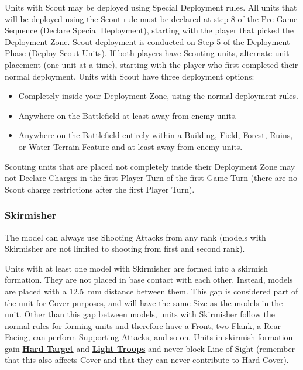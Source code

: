 Units with Scout may be deployed using Special Deployment rules. All units that will be deployed using the Scout rule must be declared at step 8 of the Pre-Game Sequence (Declare Special Deployment), starting with the player that picked the Deployment Zone. Scout deployment is conducted on Step 5 of the Deployment Phase (Deploy Scout Units). If both players have Scouting units, alternate unit placement (one unit at a time), starting with the player who first completed their normal deployment. Units with Scout have three deployment options:
\begin{itemize}[label={-}]
\item Completely inside your Deployment Zone, using the normal deployment rules.
\item Anywhere on the Battlefield at least  away from enemy units.
\item Anywhere on the Battlefield entirely within a Building, Field, Forest, Ruins, or Water Terrain Feature and at least  away from enemy units.
\end{itemize}
Scouting units that are placed not completely inside their Deployment Zone may not Declare Charges in the first Player Turn of the first Game Turn (there are no Scout charge restrictions after the first Player Turn).

\subsubsection{Skirmisher}
\label{skirmisher}

The model can always use Shooting Attacks from any rank (models with Skirmisher are not limited to shooting from first and second rank).

Units with at least one \rnf{} model with Skirmisher are formed into a skirmish formation. They are not placed in base contact with each other. Instead, models are placed with a \SI{12.5}{\milli\meter} distance  between them. This gap is considered part of the unit for Cover purposes, and will have the same Size as the models in the unit. Other than this gap between models, units with Skirmisher follow the normal rules for forming units and therefore have a Front, two Flank, a Rear Facing, can perform Supporting Attacks, and so on. Units in skirmish formation gain \hyperref[hard_target]{\textbf{Hard Target}} and \hyperref[light_troops]{\textbf{Light Troops}} and never block Line of Sight (remember that this also affects Cover and that they can never contribute to Hard Cover).

